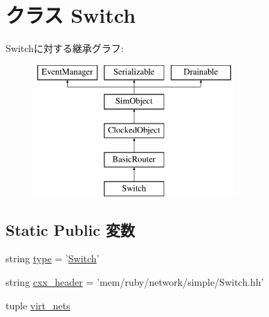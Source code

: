 \hypertarget{classSimpleNetwork_1_1Switch}{
\section{クラス Switch}
\label{classSimpleNetwork_1_1Switch}
}
Switchに対する継承グラフ:\begin{figure}[H]
\begin{center}
\leavevmode
\includegraphics[height=5cm]{classSimpleNetwork_1_1Switch}
\end{center}
\end{figure}
\subsection*{Static Public 変数}
\begin{DoxyCompactItemize}
\item 
string \hyperlink{classSimpleNetwork_1_1Switch_acce15679d830831b0bbe8ebc2a60b2ca}{type} = '\hyperlink{classSimpleNetwork_1_1Switch}{Switch}'
\item 
string \hyperlink{classSimpleNetwork_1_1Switch_a17da7064bc5c518791f0c891eff05fda}{cxx\_\-header} = 'mem/ruby/network/simple/Switch.hh'
\item 
tuple \hyperlink{classSimpleNetwork_1_1Switch_a84c7a415611bc1b55aa5e7fd9e9601e8}{virt\_\-nets}
\end{DoxyCompactItemize}


